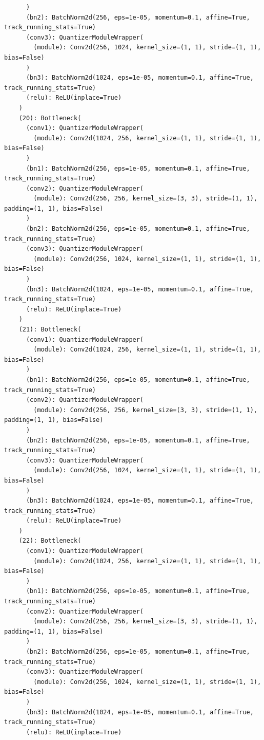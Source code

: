 \documentclass{article}
\begin{document}
\begin{verbatim}
      )
      (bn2): BatchNorm2d(256, eps=1e-05, momentum=0.1, affine=True, track_running_stats=True)
      (conv3): QuantizerModuleWrapper(
        (module): Conv2d(256, 1024, kernel_size=(1, 1), stride=(1, 1), bias=False)
      )
      (bn3): BatchNorm2d(1024, eps=1e-05, momentum=0.1, affine=True, track_running_stats=True)
      (relu): ReLU(inplace=True)
    )
    (20): Bottleneck(
      (conv1): QuantizerModuleWrapper(
        (module): Conv2d(1024, 256, kernel_size=(1, 1), stride=(1, 1), bias=False)
      )
      (bn1): BatchNorm2d(256, eps=1e-05, momentum=0.1, affine=True, track_running_stats=True)
      (conv2): QuantizerModuleWrapper(
        (module): Conv2d(256, 256, kernel_size=(3, 3), stride=(1, 1), padding=(1, 1), bias=False)
      )
      (bn2): BatchNorm2d(256, eps=1e-05, momentum=0.1, affine=True, track_running_stats=True)
      (conv3): QuantizerModuleWrapper(
        (module): Conv2d(256, 1024, kernel_size=(1, 1), stride=(1, 1), bias=False)
      )
      (bn3): BatchNorm2d(1024, eps=1e-05, momentum=0.1, affine=True, track_running_stats=True)
      (relu): ReLU(inplace=True)
    )
    (21): Bottleneck(
      (conv1): QuantizerModuleWrapper(
        (module): Conv2d(1024, 256, kernel_size=(1, 1), stride=(1, 1), bias=False)
      )
      (bn1): BatchNorm2d(256, eps=1e-05, momentum=0.1, affine=True, track_running_stats=True)
      (conv2): QuantizerModuleWrapper(
        (module): Conv2d(256, 256, kernel_size=(3, 3), stride=(1, 1), padding=(1, 1), bias=False)
      )
      (bn2): BatchNorm2d(256, eps=1e-05, momentum=0.1, affine=True, track_running_stats=True)
      (conv3): QuantizerModuleWrapper(
        (module): Conv2d(256, 1024, kernel_size=(1, 1), stride=(1, 1), bias=False)
      )
      (bn3): BatchNorm2d(1024, eps=1e-05, momentum=0.1, affine=True, track_running_stats=True)
      (relu): ReLU(inplace=True)
    )
    (22): Bottleneck(
      (conv1): QuantizerModuleWrapper(
        (module): Conv2d(1024, 256, kernel_size=(1, 1), stride=(1, 1), bias=False)
      )
      (bn1): BatchNorm2d(256, eps=1e-05, momentum=0.1, affine=True, track_running_stats=True)
      (conv2): QuantizerModuleWrapper(
        (module): Conv2d(256, 256, kernel_size=(3, 3), stride=(1, 1), padding=(1, 1), bias=False)
      )
      (bn2): BatchNorm2d(256, eps=1e-05, momentum=0.1, affine=True, track_running_stats=True)
      (conv3): QuantizerModuleWrapper(
        (module): Conv2d(256, 1024, kernel_size=(1, 1), stride=(1, 1), bias=False)
      )
      (bn3): BatchNorm2d(1024, eps=1e-05, momentum=0.1, affine=True, track_running_stats=True)
      (relu): ReLU(inplace=True)

\end{verbatim}
\end{document}
